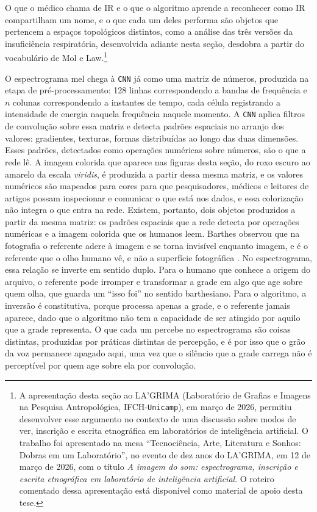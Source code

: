 O que o médico chama de IR e o que o algoritmo aprende a reconhecer como IR compartilham um nome, e o que cada um deles performa são objetos que pertencem a espaços topológicos distintos, como a análise das três versões da insuficiência respiratória, desenvolvida adiante nesta seção, desdobra a partir do vocabulário de Mol e Law.\footnote{A apresentação desta seção ao LA'GRIMA (Laboratório de Grafias e Imagens na Pesquisa Antropológica, IFCH-\texttt{Unicamp}), em março de 2026, permitiu desenvolver esse argumento no contexto de uma discussão sobre modos de ver, inscrição e escrita etnográfica em laboratórios de inteligência artificial. O trabalho foi apresentado na mesa \enquote{Tecnociência, Arte, Literatura e Sonhos: Dobras em um Laboratório}, no evento de dez anos do LA'GRIMA, em 12 de março de 2026, com o título \textit{A imagem do som: espectrograma, inscrição e escrita etnográfica em laboratório de inteligência artificial}. O roteiro comentado dessa apresentação está disponível como material de apoio desta tese.}

O espectrograma mel chega à \texttt{CNN} já como uma matriz de números, produzida na etapa de pré-processamento: 128 linhas correspondendo a bandas de frequência e $n$ colunas correspondendo a instantes de tempo, cada célula registrando a intensidade de energia naquela frequência naquele momento. A \texttt{CNN} aplica filtros de convolução sobre essa matriz e detecta padrões espaciais no arranjo dos valores: gradientes, texturas, formas distribuídas ao longo das duas dimensões. Esses padrões, detectados como operações numéricas sobre números, são o que a rede lê. A imagem colorida que aparece nas figuras desta seção, do roxo escuro ao amarelo da escala \textit{viridis}, é produzida a partir dessa mesma matriz, e os valores numéricos são mapeados para cores para que pesquisadores, médicos e leitores de artigos possam inspecionar e comunicar o que está nos dados, e essa colorização não integra o que entra na rede. Existem, portanto, dois objetos produzidos a partir da mesma matriz: os padrões espaciais que a rede detecta por operações numéricas e a imagem colorida que os humanos leem. Barthes observou que na fotografia o referente adere à imagem e se torna invisível enquanto imagem, e é o referente que o olho humano vê, e não a superfície fotográfica \parencite[pp.~5--6]{Barthes1984}. No espectrograma, essa relação se inverte em sentido duplo. Para o humano que conhece a origem do arquivo, o referente pode irromper e transformar a grade em algo que age sobre quem olha, que guarda um \enquote{isso foi} no sentido barthesiano. Para o algoritmo, a inversão é constitutiva, porque processa apenas a grade, e o referente jamais aparece, dado que o algoritmo não tem a capacidade de ser atingido por aquilo que a grade representa. O que cada um percebe no espectrograma são coisas distintas, produzidas por práticas distintas de percepção, e é por isso que o grão da voz permanece apagado aqui, uma vez que o silêncio que a grade carrega não é perceptível por quem age sobre ela por convolução.

